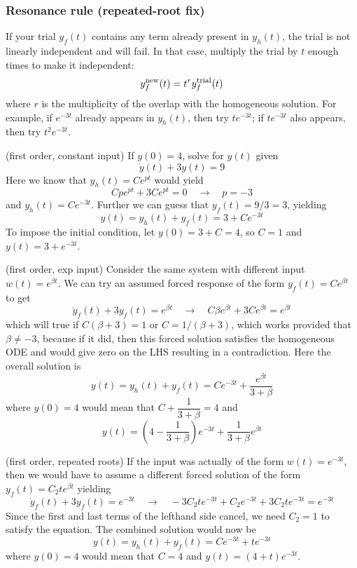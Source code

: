 \documentclass[12pt]{article}
\begin{document}
\subsubsection*{Resonance rule (repeated-root fix)}
If your trial $y_f(t)$ contains any term already present in $y_h(t)$, the trial is not linearly independent and will fail. In that case, multiply the trial by $t$ enough times to make it independent:
$$
y_f^{\rm new}(t) = t^r y_f^{\rm trial}(t)
$$
where $r$ is the multiplicity of the overlap with the homogeneous solution. For example, if $e^{-3t}$ already appears in $y_h(t)$, then try $t e^{-3t}$; if $t e^{-3t}$ also appears, then try $t^2 e^{-3t}$.

\begin{example} (first order, constant input) 
If $y(0)=4$, solve for $y(t)$ given 
$$\dot y(t) + 3 y(t) = 9 $$
Here we know that $y_h(t) = Ce^{pt}$ would yield
$$
Cpe^{pt} + 3 Ce^{pt} = 0 \quad \to \quad p=-3
$$
and $y_h(t) = Ce^{-3t}$. Further we can guess that $y_f(t) = 9/3=3$, yielding 
$$
y(t) = y_h(t) + y_f(t) = 3 + Ce^{-3t}
$$
To impose the initial condition, let $y(0)=3+C=4$, so $C=1$ and $y(t) = 3 + e^{-3t}$.
\end{example}

\begin{example} (first order, exp input) Consider the same system with different input $w(t) = e^{\beta t}$. We can try an assumed forced response of the form
$y_f(t) = C e^{\beta t}$ to get
$$
\dot y_f(t) + 3 y_f(t) =  e^{\beta t} \quad \to \quad C\beta e^{\beta t} + 3 C e^{\beta t} = e^{\beta t}
$$
which will true if $C(\beta + 3) = 1$ or $C=1/(\beta+3)$, which works provided that $\beta \neq -3$, because if it did, then this forced solution satisfies the homogeneous ODE and would give zero on the LHS resulting in a contradiction.  
Here the overall solution is
$$
y(t) = y_h(t) + y_f(t) = C e^{-3t} + \dfrac{e^{\beta t}}{3+\beta}
$$
where $y(0)=4$ would mean that $C + \dfrac{1}{3+\beta} = 4$ and 
$$y(t) = (4- \dfrac{1}{3+\beta}) e^{-3t}+ \dfrac{1}{3+\beta}e^{\beta t}$$
\end{example}

\begin{example} (first order, repeated roots) If the input was actually of the form $w(t) = e^{-3 t}$, then we would have to assume a different forced solution of the form $y_f(t) = C_2t e^{\beta t}$ yielding
$$
\dot y_f(t) + 3 y_f(t) =  e^{-3 t} \quad \to \quad -3 C_2t e^{-3 t} + C_2 e^{-3 t} + 3 C_2t e^{-3 t} = e^{-3 t}
$$
Since the first and last terms of the lefthand side cancel, we need $C_2=1$ to satisfy the equation. The combined solution would now be
$$
y(t) = y_h(t) + y_f(t) = C e^{-3t} + te^{-3t}
$$
where $y(0)=4$ would mean that $C=4$ and $y(t) = (4 + t)e^{-3t}$.
\end{example}
\end{document}
